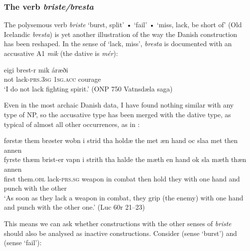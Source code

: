 \documentclass[output=paper]{langscibook}
\begin{document}
\subsubsection{The verb \textit{briste/bresta}} \label{heltoft:2.5.2}

The polysemous verb \textit{briste} ‘burst, split' • ‘fail' • ‘miss, lack, be short of' (Old Icelandic \textit{bresta}) is yet another illustration of the way the Danish construction has been reshaped. In the sense of ‘lack, miss', \textit{bresta} is documented with an accusative A1 \textit{mik} (the dative is \textit{mér}):

\begin{exe}
\ex  \label{ex:heltoft:30}
    \gll eigi   brest-r     mik       áræði\\
         not   lack-\textsc{prs.3sg}  \textsc{1sg.acc}    courage\\
    \glt ‘I do not lack fighting spirit.' (ONP 750 Vatnsdæla saga)
\end{exe}

Even in the most archaic Danish data, I have found nothing similar with any type of NP, so the accusative type has been merged with the dative type, as typical of almost all other occurrences, as in :

\begin{exe}
\ex    \label{ex:heltoft:31}
    \glll førstæ them brøster wobn i strid tha holdæ the met æn hand oc slaa met then annen\\
        fyrste   thæm      brist-er     vapn     i strith      tha   halde   the  mæth en hand   ok     sla     mæth thæn annen\\
        first  them.\textsc{obl}   lack-\textsc{prs.sg}  weapon in combat  then   hold  they  with one hand    and   punch  with the other\\
    \glt ‘As soon as they lack a weapon in combat, they grip (the enemy) with one hand and punch with the other one.' (Luc 60r 21--23)
\end{exe}

This means we can ask whether constructions with the other senses of \textit{briste} should also be analysed as inactive constructions. Consider  (sense ‘burst') and  (sense ‘fail'):
\end{document}

